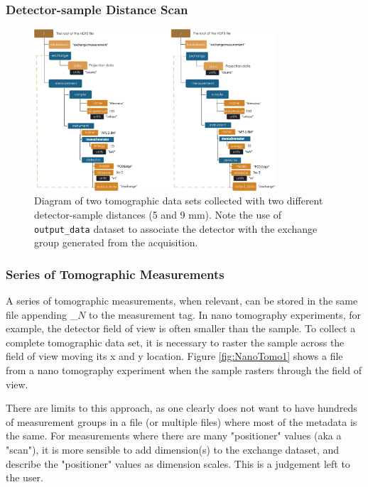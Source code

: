 \subsubsection{Detector-sample Distance Scan}
\begin{figure}[h!]
\centering
\includegraphics[width=0.8\textwidth]{figures/dx_MinimalTomo4.pdf}
\caption{Diagram of two tomographic data sets collected with two different detector-sample distances (5 and 9 mm). Note the use of {\tt output\_data} dataset to associate the detector with the exchange group generated from the acquisition.}
\label{fig:MinimalTomo4}
\end{figure}

\subsubsection{Series of Tomographic Measurements}

A series of tomographic measurements, when relevant, can be stored in the same file appending \_$N$ to the measurement tag. In nano tomography experiments, for example, the detector field of view is often smaller than the sample. To collect a complete tomographic data set, it is necessary to raster the sample across the field of view moving its x and y location. Figure \ref{fig:NanoTomo1}  shows a file from a nano tomography experiment when the sample rasters through the field of view.  

There are limits to this approach, as one clearly does not want to have hundreds of measurement groups in a file (or multiple files) where most of the metadata is the same. For measurements where there are many "positioner" values (aka a "scan"), it is more sensible to add dimension(s) to the exchange dataset, and describe the "positioner" values as dimension scales. This is a judgement left to the user.

